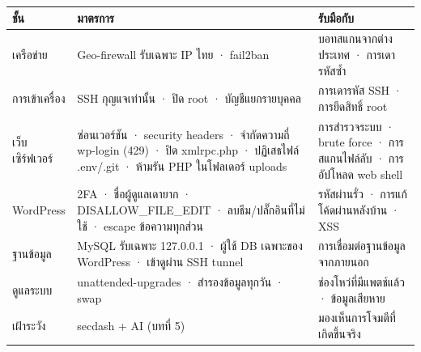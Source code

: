 \begingroup\small\begin{longtable}[]{@{}>{\raggedright\arraybackslash}p{}>{\raggedright\arraybackslash}p{}>{\raggedright\arraybackslash}p{}@{}}
\toprule\noalign{}
ชั้น & มาตรการ & รับมือกับ \\
\midrule\noalign{}
\endhead
\bottomrule\noalign{}
\endlastfoot
เครือข่าย & Geo-firewall รับเฉพาะ IP ไทย · fail2ban & บอทสแกนจากต่างประเทศ · การเดารหัสซ้ำ \\
การเข้าเครื่อง & SSH กุญแจเท่านั้น · ปิด root · บัญชีแยกรายบุคคล & การเดารหัส SSH · การยึดสิทธิ์ root \\
เว็บเซิร์ฟเวอร์ & ซ่อนเวอร์ชัน · security headers · จำกัดความถี่ wp-login (429) · ปิด xmlrpc.php · ปฏิเสธไฟล์ .env/.git · ห้ามรัน PHP ในโฟลเดอร์ uploads & การสำรวจระบบ · brute force · การสแกนไฟล์ลับ · การอัปโหลด web shell \\
WordPress & 2FA · ชื่อผู้ดูแลเดายาก · DISALLOW\_FILE\_EDIT · ลบธีม/ปลั๊กอินที่ไม่ใช้ · escape ข้อความทุกส่วน & รหัสผ่านรั่ว · การแก้โค้ดผ่านหลังบ้าน · XSS \\
ฐานข้อมูล & MySQL รับเฉพาะ 127.0.0.1 · ผู้ใช้ DB เฉพาะของ WordPress · เข้าดูผ่าน SSH tunnel & การเชื่อมต่อฐานข้อมูลจากภายนอก \\
ดูแลระบบ & unattended-upgrades · สำรองข้อมูลทุกวัน · swap & ช่องโหว่ที่มีแพตช์แล้ว · ข้อมูลเสียหาย \\
เฝ้าระวัง & secdash + AI (บทที่ 5) & มองเห็นการโจมตีที่เกิดขึ้นจริง \\
\end{longtable}\endgroup
